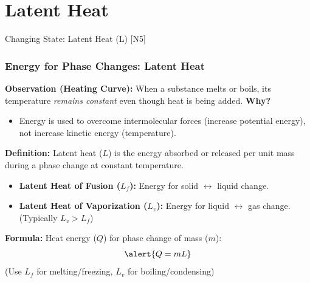 \documentclass[xcolor=svgnames]{beamer}
\begin{document}
\section{Latent Heat}
\begin{frame}{Changing State: Latent Heat (L) [N5]}
    \frametitle{Energy for Phase Changes: Latent Heat}
    \textbf{Observation (Heating Curve):} When a substance melts or boils, its temperature \textit{remains constant} even though heat is being added.
    \vspace{1em}
    \textbf{Why?}
    \begin{itemize}
        \item Energy is used to overcome intermolecular forces (increase potential energy), not increase kinetic energy (temperature).
    \end{itemize}
    \vspace{1em}
    \textbf{Definition:} Latent heat ($L$) is the energy absorbed or released per unit mass during a phase change at constant temperature.
    \begin{itemize}
        \item \textbf{Latent Heat of Fusion ($L_f$):} Energy for solid $\leftrightarrow$ liquid change.
        \item \textbf{Latent Heat of Vaporization ($L_v$):} Energy for liquid $\leftrightarrow$ gas change. (Typically $L_v > L_f$)
    \end{itemize}
    \textbf{Formula:} Heat energy ($Q$) for phase change of mass ($m$):
    \begin{equation*}
    \alert{Q = mL}
    \end{equation*}
    (Use $L_f$ for melting/freezing, $L_v$ for boiling/condensing)
\end{frame}
\end{document}
